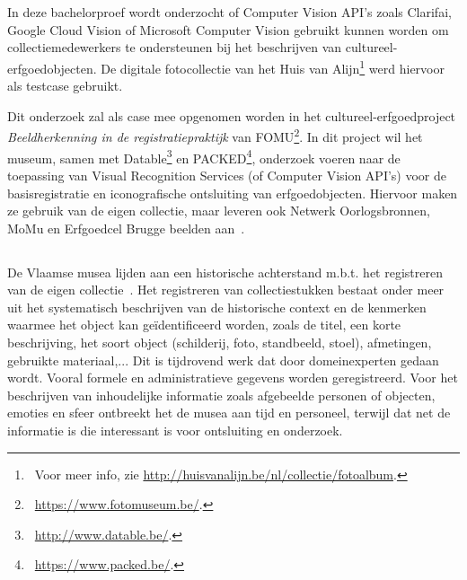 
\chapter{}
\label{ch:inleiding}

In deze bachelorproef wordt onderzocht of Computer Vision API’s zoals Clarifai, Google Cloud Vision of Microsoft Computer Vision gebruikt kunnen worden om collectiemedewerkers te ondersteunen bij het beschrijven van cultureel-erfgoedobjecten. De digitale fotocollectie van het Huis van Alijn\footnote{~Voor meer info, zie \url{http://huisvanalijn.be/nl/collectie/fotoalbum}.} werd hiervoor als testcase gebruikt.

Dit onderzoek zal als case mee opgenomen worden in het cultureel-erfgoedproject \textit{Beeldherkenning in de registratiepraktijk} van FOMU\footnote{~\url{https://www.fotomuseum.be/}.}. In dit project wil het museum, samen met Datable\footnote{~\url{http://www.datable.be/}.} en PACKED\footnote{~\url{https://www.packed.be/}.}, onderzoek voeren naar de toepassing van Visual Recognition Services (of Computer Vision API’s) voor de basisregistratie en iconografische ontsluiting van erfgoedobjecten. Hiervoor maken ze gebruik van de eigen collectie, maar leveren ook Netwerk Oorlogsbronnen, MoMu en Erfgoedcel Brugge beelden aan~\autocite{Derveaux2019}.


\section{}
\label{sec:probleemstelling}

De Vlaamse musea lijden aan een historische achterstand m.b.t. het registreren van de eigen collectie~\autocite{Gatz2016}. Het registreren van collectiestukken bestaat onder meer uit het systematisch beschrijven van de historische context en de kenmerken waarmee  het object kan geïdentificeerd worden, zoals de titel, een korte beschrijving, het soort object (schilderij, foto, standbeeld, stoel), afmetingen, gebruikte materiaal,... Dit is tijdrovend werk dat door domeinexperten gedaan wordt. Vooral formele en administratieve gegevens worden geregistreerd. Voor het beschrijven van inhoudelijke informatie zoals afgebeelde personen of objecten, emoties en sfeer ontbreekt het de musea aan tijd en personeel, terwijl dat net de informatie is die interessant is voor ontsluiting en onderzoek.

